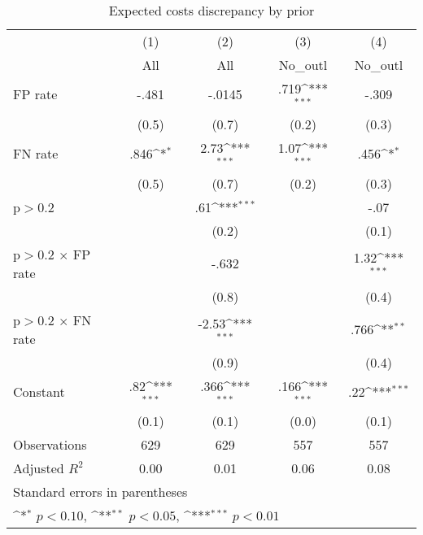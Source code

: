 \begin{table}[htbp]\centering
\def\sym#1{\ifmmode^{#1}\else\(^{#1}\)\fi}
\caption{Expected costs discrepancy by prior}
\begin{tabular}{l*{4}{c}}
\hline\hline
                &\multicolumn{1}{c}{(1)}&\multicolumn{1}{c}{(2)}&\multicolumn{1}{c}{(3)}&\multicolumn{1}{c}{(4)}\\
                &\multicolumn{1}{c}{All}&\multicolumn{1}{c}{All}&\multicolumn{1}{c}{No\_outl}&\multicolumn{1}{c}{No\_outl}\\
\hline
FP rate         &    -.481         &   -.0145         &     .719\sym{***}&    -.309         \\
                &    (0.5)         &    (0.7)         &    (0.2)         &    (0.3)         \\
FN rate         &     .846\sym{*}  &     2.73\sym{***}&     1.07\sym{***}&     .456\sym{*}  \\
                &    (0.5)         &    (0.7)         &    (0.2)         &    (0.3)         \\
p$>$0.2         &                  &      .61\sym{***}&                  &     -.07         \\
                &                  &    (0.2)         &                  &    (0.1)         \\
p$>$0.2 $\times$ FP rate&                  &    -.632         &                  &     1.32\sym{***}\\
                &                  &    (0.8)         &                  &    (0.4)         \\
p$>$0.2 $\times$ FN rate&                  &    -2.53\sym{***}&                  &     .766\sym{**} \\
                &                  &    (0.9)         &                  &    (0.4)         \\
Constant        &      .82\sym{***}&     .366\sym{***}&     .166\sym{***}&      .22\sym{***}\\
                &    (0.1)         &    (0.1)         &    (0.0)         &    (0.1)         \\
\hline
Observations    &      629         &      629         &      557         &      557         \\
Adjusted \(R^{2}\)&     0.00         &     0.01         &     0.06         &     0.08         \\
\hline\hline
\multicolumn{5}{l}{\footnotesize Standard errors in parentheses}\\
\multicolumn{5}{l}{\footnotesize \sym{*} \(p<0.10\), \sym{**} \(p<0.05\), \sym{***} \(p<0.01\)}\\
\end{tabular}
\end{table}
